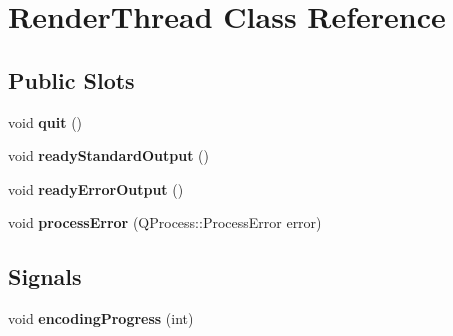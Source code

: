 \hypertarget{class_render_thread}{
\section{\-Render\-Thread \-Class \-Reference}
\label{class_render_thread}
}
\subsection*{\-Public \-Slots}
\begin{DoxyCompactItemize}
\item 
\hypertarget{class_render_thread_aeb65f79ac808b731dcca17fc2752c06a}{
void {\bfseries quit} ()}
\label{class_render_thread_aeb65f79ac808b731dcca17fc2752c06a}

\item 
\hypertarget{class_render_thread_a1790e0bbcb6845a4ee6ec5dd43e9a66e}{
void {\bfseries ready\-Standard\-Output} ()}
\label{class_render_thread_a1790e0bbcb6845a4ee6ec5dd43e9a66e}

\item 
\hypertarget{class_render_thread_a127207f47ccae1a1273a239d92d1fd97}{
void {\bfseries ready\-Error\-Output} ()}
\label{class_render_thread_a127207f47ccae1a1273a239d92d1fd97}

\item 
\hypertarget{class_render_thread_a12221e9e13a187ada9c88aa69735d86e}{
void {\bfseries process\-Error} (\-Q\-Process\-::\-Process\-Error error)}
\label{class_render_thread_a12221e9e13a187ada9c88aa69735d86e}

\end{DoxyCompactItemize}
\subsection*{\-Signals}
\begin{DoxyCompactItemize}
\item 
\hypertarget{class_render_thread_aead3eaf249c6a1508d179740e6f02f75}{
void {\bfseries encoding\-Progress} (int)}
\label{class_render_thread_aead3eaf249c6a1508d179740e6f02f75}

\end{DoxyCompactItemize}
